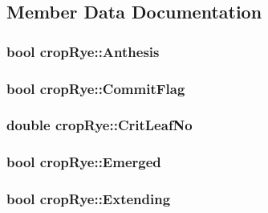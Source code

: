 \subsection{Member Data Documentation}
\hypertarget{classcrop_rye_adb2fff10b6b8b877dd631ac43dd9d9f5}{
\subsubsection[{Anthesis}]{\setlength{\rightskip}{0pt plus 5cm}bool {\bf cropRye::Anthesis}}}
\label{classcrop_rye_adb2fff10b6b8b877dd631ac43dd9d9f5}
\hypertarget{classcrop_rye_a875706750260242842d47798984fd748}{
\subsubsection[{CommitFlag}]{\setlength{\rightskip}{0pt plus 5cm}bool {\bf cropRye::CommitFlag}}}
\label{classcrop_rye_a875706750260242842d47798984fd748}
\hypertarget{classcrop_rye_a3c7fdd1d8fa45ed6ba4ff5f62f31e2c9}{
\subsubsection[{CritLeafNo}]{\setlength{\rightskip}{0pt plus 5cm}double {\bf cropRye::CritLeafNo}}}
\label{classcrop_rye_a3c7fdd1d8fa45ed6ba4ff5f62f31e2c9}
\hypertarget{classcrop_rye_af90c57ab4b93d1582316d3a56d3322fe}{
\subsubsection[{Emerged}]{\setlength{\rightskip}{0pt plus 5cm}bool {\bf cropRye::Emerged}}}
\label{classcrop_rye_af90c57ab4b93d1582316d3a56d3322fe}
\hypertarget{classcrop_rye_a17362b421105a32ee37a63770e0a604b}{
\subsubsection[{Extending}]{\setlength{\rightskip}{0pt plus 5cm}bool {\bf cropRye::Extending}}}
